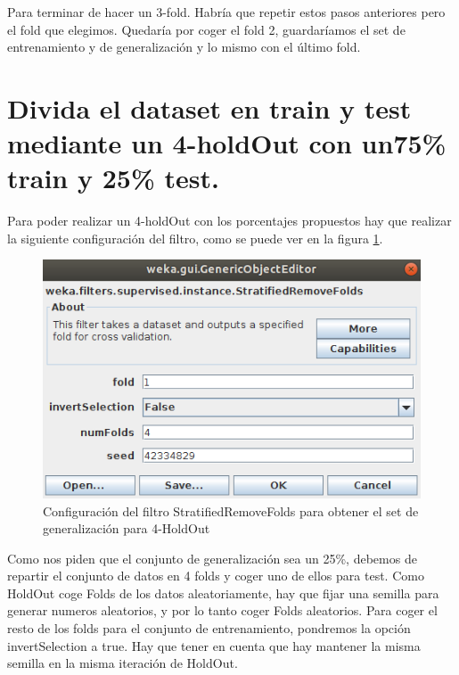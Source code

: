 \documentclass[11pt,twoside,a4paper]{book}
\begin{document}
Para terminar de hacer un 3-fold. Habría que repetir estos pasos anteriores pero
el fold que elegimos. Quedaría por coger el fold 2, guardaríamos el set de
entrenamiento y de generalización y lo mismo con el último fold.


\section{Divida el dataset en train y test mediante un 4-holdOut con un75\% train y 25\% test.}
Para poder realizar un 4-holdOut con los porcentajes propuestos hay que realizar la
siguiente configuración del filtro, como se puede ver en la figura \ref{Fig15}.

\begin{figure}[H]
	\includegraphics[width=\textwidth]{ejercicio3_3.png}
	\caption{Configuración del filtro StratifiedRemoveFolds para obtener el set de generalización para 4-HoldOut}
	\label{Fig15}
\end{figure}

Como nos piden que el conjunto de generalización sea un 25\%, debemos de repartir el conjunto
de datos en 4 folds y coger uno de ellos para test. Como HoldOut coge Folds de los datos
aleatoriamente, hay que fijar una semilla para generar numeros aleatorios, y por lo tanto
coger Folds aleatorios. Para coger el resto de los folds para el conjunto de entrenamiento,
pondremos la opción invertSelection a true. Hay que tener en cuenta que hay mantener la
misma semilla en la misma iteración de HoldOut.
\end{document}
